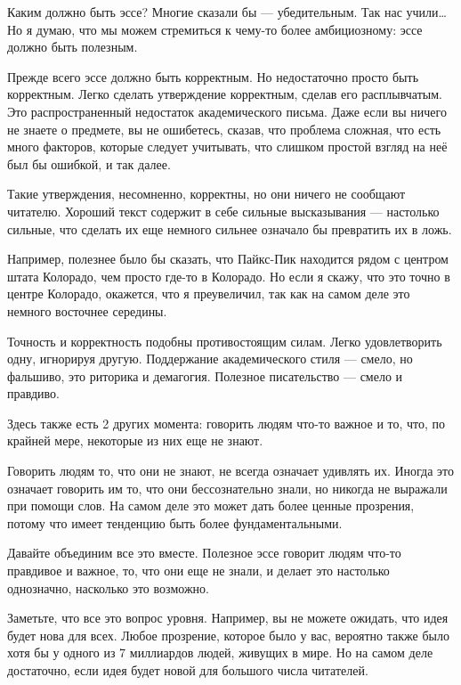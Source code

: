 \documentclass[ebook,12pt,oneside,openany]{memoir}
\date{}
\begin{document}
\maketitle

Каким должно быть эссе? Многие сказали бы — убедительным. Так нас
учили… Но я думаю, что мы можем стремиться к чему-то более
амбициозному: эссе должно быть полезным.

Прежде всего эссе должно быть корректным. Но недостаточно просто быть
корректным. Легко сделать утверждение корректным, сделав его
расплывчатым. Это распространенный недостаток академического письма.
Даже если вы ничего не знаете о предмете, вы не ошибетесь, сказав, что
проблема сложная, что есть много факторов, которые следует учитывать,
что слишком простой взгляд на неё был бы ошибкой, и так далее.

Такие утверждения, несомненно, корректны, но они ничего не сообщают
читателю. Хороший текст содержит в себе сильные высказывания —
настолько сильные, что сделать их еще немного сильнее означало бы
превратить их в ложь.

Например, полезнее было бы сказать, что Пайкс-Пик находится рядом с
центром штата Колорадо, чем просто где-то в Колорадо. Но если я скажу,
что это точно в центре Колорадо, окажется, что я преувеличил, так как
на самом деле это немного восточнее середины.

Точность и корректность подобны противостоящим силам. Легко
удовлетворить одну, игнорируя другую. Поддержание академического стиля
— смело, но фальшиво, это риторика и демагогия. Полезное писательство
— смело и правдиво.

Здесь также есть 2 других момента: говорить людям что-то важное и то,
что, по крайней мере, некоторые из них еще не знают.

Говорить людям то, что они не знают, не всегда означает удивлять их.
Иногда это означает говорить им то, что они бессознательно знали, но
никогда не выражали при помощи слов. На самом деле это может дать
более ценные прозрения, потому что имеет тенденцию быть более
фундаментальными.

Давайте объединим все это вместе. Полезное эссе говорит людям что-то
правдивое и важное, то, что они еще не знали, и делает это настолько
однозначно, насколько это возможно.

Заметьте, что все это вопрос уровня. Например, вы не можете ожидать,
что идея будет нова для всех. Любое прозрение, которое было у вас,
вероятно также было хотя бы у одного из 7 миллиардов людей, живущих в
мире. Но на самом деле достаточно, если идея будет новой для большого
числа читателей.
\end{document}
